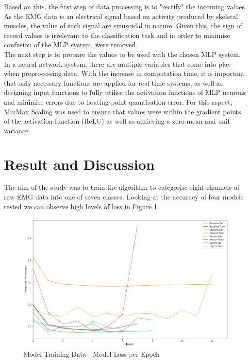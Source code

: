 \documentclass[11pt]{article}
\begin{document}
	\noindent
	Based on this, the first step of data processing is to "rectify" the incoming values. As the EMG data is an electrical signal based on activity produced by skeletal muscles, the value of such signal are sinusoidal in nature. Given this, the sign of record values is irrelevant to the classification task and in order to minimise confusion of the MLP system, were removed.\\
	
	\noindent
	The next step is to prepare the values to be used with the chosen MLP system. In a neural network system, there are multiple variables that come into play when preprocessing data. With the increase in computation time, it is important that only necessary functions are applied for real-time systems, as well as designing input functions to fully utilise the activation functions of MLP neurons and minimise errors due to floating point quantisation error. For this aspect, MinMax Scaling was used to ensure that values were within the gradient points of the activation function (ReLU) as well as achieving a zero mean and unit variance.
	
	\section{Result and Discussion}
	The aim of the study was to train the algorithm to categorise eight channels of raw EMG data into one of seven classes. Looking at the accuracy of four models tested we can observe high levels of loss in Figure \ref{fig:models}.
	
	\begin{figure}[H]
		\centering
		\includegraphics[width=15cm]{Figures/results}
		\caption{Model Training Data - Model Loss per Epoch}
		\label{fig:models}
	\end{figure}
	
\end{document}
